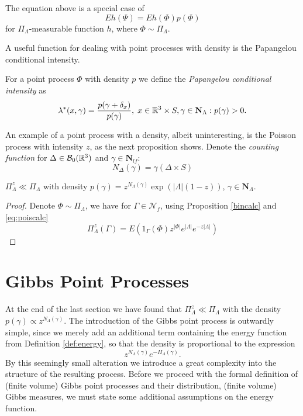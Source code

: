 	The equation above is a special case of 
$$Eh(\Psi)=Eh(\Phi)p(\Phi)$$
for $\Pi_\Lambda$-measurable function $h$, where $\Phi \sim \Pi_\Lambda$.

A useful function for dealing with point processes with density is the Papangelou conditional intensity.
\begin{definition}
	For  a point process $\Phi$ with density $p$ we define the \textit{Papangelou conditional intensity} as 
	$$\lambda^*(x,\gamma) = \frac{p(\gamma + \delta_x)}{p(\gamma)}, \; x \in {\mathbb R^3} \times S, \gamma \in \mathbf N_{\Lambda}: p(\gamma)>0.$$
\end{definition}

An example of a point process with a density, albeit uninteresting, is the Poisson process with intensity $z$, as the next proposition shows.\newline
Denote the \textit{counting function} for $\Delta \in \mathcal B_0({\mathbb R^3})$ and $\gamma \in \mathbf N_{lf}$:
$$N_\Delta(\gamma) = \gamma(\Delta \times S)$$ 

\begin{proposition}\label{prop:poisabscont} $\Pi_\Lambda^z \ll \Pi_\Lambda$ with density $p(\gamma)=z^{N_\Lambda(\gamma)} \exp(|\Lambda|(1-z))$, $\gamma \in \mathbf N_{\Lambda}$.
\end{proposition}
\begin{proof}
	Denote $\Phi \sim \Pi_\Lambda$, we have for $\Gamma\in \mathcal N_{f}$, using Proposition \ref{bincalc} and \eqref{eq:poiscalc}
	$$\Pi^z_\Lambda(\Gamma) = E(1_\Gamma(\Phi)  z^{|\Phi|} e^{|\Lambda|} e^{-z|\Lambda|}) $$
\end{proof}





\section{Gibbs Point Processes}\label{sec:GPP}
At the end of the last section we have found that $\Pi^z_\Lambda \ll \Pi_\Lambda$ with the density $p(\gamma) \propto z^{N_\Lambda(\gamma)}$. The introduction of the Gibbs point process is outwardly simple, since we merely add an additional term containing the energy function from Definition \ref{def:energy}, so that the density is proportional to the expression
\begin{equation}\label{eq:GPPdensity}z^{N_\Lambda(\gamma)} e^{-H_\Lambda (\gamma)}.\end{equation}
By this seemingly small alteration we introduce a great complexity into the structure of the resulting process. Before we proceed with the formal definition of (finite volume) Gibbs point processes and their distribution, (finite volume) Gibbs measures, we must state some additional assumptions on the energy function.


